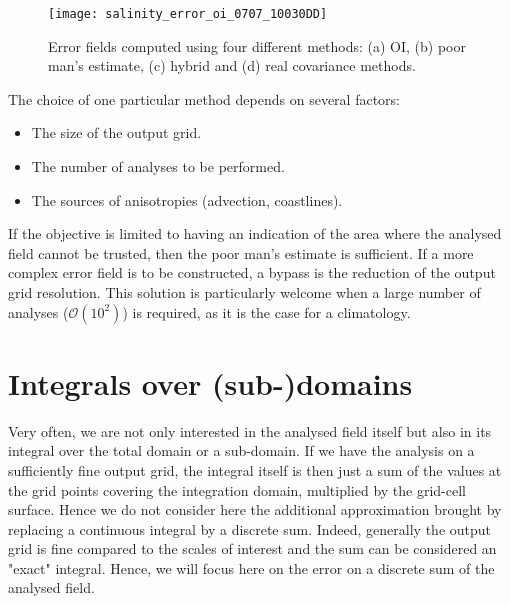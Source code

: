 \begin{figure*}[htpb]
\centering
\texttt{[image: salinity\_error\_oi\_0707\_10030DD]}
\caption{Error fields computed using four different methods: (a) OI, (b) poor man's estimate, (c) hybrid and (d) real covariance methods.\label{fig:salinity_error_oi_0707_10030DD}}
\end{figure*}

The choice of one particular method depends on several factors:
\begin{itemize}
\item The size of the output grid.
\item The number of analyses to be performed.
\item The sources of anisotropies (advection, coastlines).
\end{itemize} 

If the objective is limited to having an indication of the area where the analysed field cannot be trusted, then the poor man's estimate is sufficient. If a more complex error field is to be constructed, a bypass is the reduction of the output grid resolution. This solution is particularly welcome when a large number of analyses ($\mathcal{O}(10^{2})$) is required, as it is the case for a climatology.






\clearpage

\section{Integrals over (sub-)domains}

Very often, we are not only interested in the analysed field itself but also in its integral over the
total domain or a sub-domain. If we have the analysis on a sufficiently fine output grid, the integral
itself is then just a sum of the values at the grid points covering the integration domain, multiplied by the
grid-cell surface. Hence we do not consider here the additional approximation brought by replacing a continuous integral by
a discrete sum. Indeed, generally the output grid is fine compared to the scales of interest
and the sum can be considered an "exact" integral. Hence, we will focus here on the error on a discrete sum of the analysed field.

